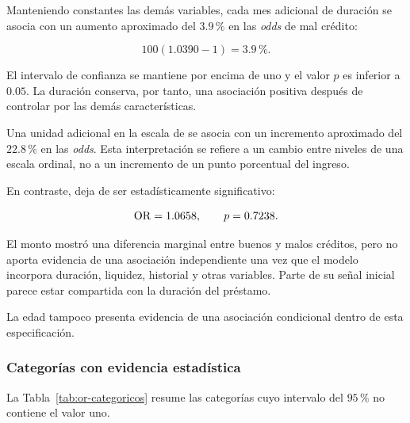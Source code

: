 Manteniendo constantes las demás variables, cada mes adicional de
duración se asocia con un aumento aproximado del \(3.9\,\%\) en las
\textit{odds} de mal crédito:

\[
100(1.0390-1)=3.9\,\%.
\]

El intervalo de confianza se mantiene por encima de uno y el valor
\(p\) es inferior a \(0.05\). La duración conserva, por tanto, una
asociación positiva después de controlar por las demás características.

Una unidad adicional en la escala de  se asocia con
un incremento aproximado del \(22.8\,\%\) en las \textit{odds}. Esta
interpretación se refiere a un cambio entre niveles de una escala
ordinal, no a un incremento de un punto porcentual del ingreso.

En contraste,  deja de ser estadísticamente
significativo:

\[
\mathrm{OR}=1.0658,
\qquad
p=0.7238.
\]

El monto mostró una diferencia marginal entre buenos y malos créditos,
pero no aporta evidencia de una asociación independiente una vez que el
modelo incorpora duración, liquidez, historial y otras variables. Parte
de su señal inicial parece estar compartida con la duración del préstamo.

La edad tampoco presenta evidencia de una asociación condicional dentro
de esta especificación.

\subsubsection{Categorías con evidencia estadística}

La Tabla~\ref{tab:or-categoricos} resume las categorías cuyo intervalo
del \(95\,\%\) no contiene el valor uno.

